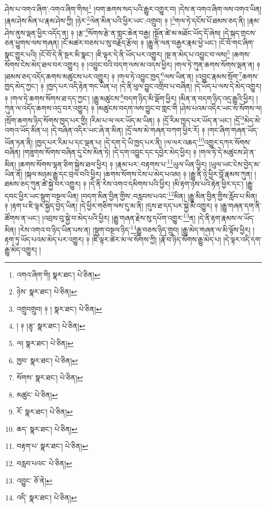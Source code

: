 ཤེས་པ་འགའ་ཞིག་:འགའ་ཞིག་གིས།\footnote{འགའ་ཞིག་གི།  སྣར་ཐང་།  པེ་ཅིན། } །བག་ཆགས་སད་པའི་རྒྱུར་འགྱུར་བ། །དེས་ན་འགའ་ཞིག་ལས་འགའ་ཡིན། །རྣམ་ཤེས་མིན་པ་རྣམ་ཤེས་ཀྱི། །ཉེར་\footnote{ཉེས་  སྣར་ཐང་།  པེ་ཅིན། }ལེན་མིན་པའི་ཕྱིར་ཡང་:འགྲུབ། ༈ །\footnote{འགྲུབགྲུབ། ༈ །  སྣར་ཐང་།  པེ་ཅིན། }གལ་ཏེ་དངོས་པོ་ཐམས་ཅད་ནི། །རྣམ་ཤེས་ནུས་ལྡན་ཕྱིར་འདོད་ན། ༈ །རྩ་\footnote{། ༈ །རྩྭ་  སྣར་ཐང་།  པེ་ཅིན། }སོགས་རྩེ་ན་གླང་ཆེན་བརྒྱ། །སྔོན་ཚེ་མ་མཐོང་ཡོད་དོ་ཞེས། །དེ་སྐད་གྲངས་ཅན་ཕྱུགས་ལས་གཞན། །ངོ་མཚར་བཅས་པ་སུ་བརྗོད་རྩོལ། ༈ །རྒྱུ་ནི་ལན་བརྒྱར་རྣམ་ཕྱེ་ཡང་། །ངོ་བོ་གང་ཞིག་སྣང་གྱུར་པའི། །ངོ་བོ་དེ་ནི་སྔར་མི་སྣང་། །ཇི་ལྟར་དེ་ནི་ཡོད་པར་འགྱུར། །སྔ་ན་མེད་པ་འབྱུང་བ་ལས།\footnote{ལ།  སྣར་ཐང་།  པེ་ཅིན། } །ཆགས་སོགས་ངེས་མེད་ཐལ་བར་འགྱུར། ༈ །འབྱུང་བའི་བདག་ལས་མ་འདས་ཕྱིར། །གལ་ཏེ་ཀུན་ཆགས་སོགས་ལྡན་ན། ༈ །ཐམས་ཅད་འདོད་ཆགས་མཚུངས་པར་འགྱུར། ༈ །གལ་ཏེ་འབྱུང་ཁྱད་\footnote{ཁྱབ་  སྣར་ཐང་།  པེ་ཅིན། }ལས་ཡིན་ན། །འབྱུང་རྣམས་སྲོག་\footnote{སོགས་  སྣར་ཐང་།  པེ་ཅིན། }ཆགས་ཁྱད་མེད་ཀྱང་། ༈ །ཁྱད་པར་འདི་རྟེན་གང་ཡིན་པ། །དེ་ནི་ཕུལ་བྱུང་འགྲིབ་པ་བཞིན། །དེ་ཡོད་པ་ལས་དེ་མེད་འགྱུར། ༈ །གལ་ཏེ་ཆགས་སོགས་ཐ་དད་ཀྱང་། །རྒྱུ་མཚུངས་\footnote{མཚུང་  པེ་ཅིན། }བདག་ཉིད་མི་ལྡོག་ཕྱིར། །མིན་ན་བདག་ཉིད་འདྲ་རྒྱུའི་ཕྱིར། །ཀུན་ལ་འདོད་ཆགས་འདྲ་བར་འགྱུར། ༈ །མཚུངས་བདག་ལས་བྱུང་བ་གླང་གི །ཤེས་པའམ་འདིར་ཡང་ས་སོགས་ལ། །སྲོག་ཆགས་ཉིད་སོགས་ཁྱད་པར་གྱི། །རིམ་པ་ལ་ལར་ཡོད་མ་ཡིན། ༈ །དྲོ་རིམ་ཁྱད་པར་ཡོད་ན་ཡང་། །དྲོ་\footnote{རོ་  སྣར་ཐང་།  པེ་ཅིན། }མེད་མེ་འགའ་ཡོད་མིན་པ། །དེ་བཞིན་འདིར་ཡང་ཞེ་ན་མིན། །དྲོ་ལས་མེ་གཞན་བཀག་ཕྱིར་རོ། ༈ །གང་ཞིག་གཞན་ཡོད་ཡོན་ཏན་ནི། །ཁྱད་པར་རིམ་པ་དང་ལྡན་པ། །དེ་དག་དེ་ཡི་ཁྱད་པར་ནི། །ལ་ལར་འཆད་\footnote{ཆད་  སྣར་ཐང་།  པེ་ཅིན། }འགྱུར་དཀར་སོགས་བཞིན། །གཟུགས་སོགས་བཞིན་དུ་ངེས་མིན་ཏེ། །དེ་དག་འབྱུང་དང་དབྱེར་མེད་ཕྱིར། ༈ །གལ་ཏེ་དེ་མཚུངས་ཤེ་ན་མིན། །ཆགས་སོགས་ལྷན་ཅིག་སྐྱེས་ཐལ་ཕྱིར། ༈ །རྣམ་པར་:བརྟགས་པ་\footnote{བརྟག་པ་  སྣར་ཐང་།  པེ་ཅིན། }ཡུལ་ཡིན་ཕྱིར། །ཡུལ་ཡང་ངེས་བྱེད་མ་ཡིན་ནོ། །སྐལ་མཉམ་རྒྱུ་དང་བྲལ་བའི་ཕྱིར། །ཆགས་སོགས་ངེས་པ་མེད་པའམ། ༈ །རྒྱུ་ནི་ཉེ་ཕྱིར་བློ་རྣམས་ཀུན། །ཐམས་ཅད་ཀུན་ཚེ་སྐྱེ་བར་འགྱུར། ༈ །དེ་ནི་རེས་འགའ་དམིགས་པའི་ཕྱིར། །མི་རྟག་ཉེས་པའི་རྟེན་ཕྱིར་དང་། །རྒྱུ་དབང་ཕྱིར་ཡང་སྡུག་བསྔལ་ཡིན། །བདག་མིན་བྱིན་གྱིས་:བརླབས་པའང་\footnote{བརླབ་པའང་  པེ་ཅིན། }མིན། །རྒྱུ་མིན་བྱིན་གྱིས་རློབ་པ་མིན། ༈ །རྟག་པ་ཇི་ལྟར་སྐྱེད་བྱེད་ཡིན། །དེ་ཕྱིར་གཅིག་ལས་དུ་མ་ནི། །དུས་ཐ་དད་པར་སྐྱེ་མི་འགྱུར། ༈ །རྒྱུ་གཞན་དག་ནི་ཚོགས་ན་ཡང་། །འབྲས་བུ་སྐྱེ་བ་མེད་པའི་ཕྱིར། །རྒྱུ་གཞན་རྗེས་སུ་དཔོག་འགྱུར་\footnote{འབྱུང་  ཅོ་ནེ། }ན། །དེ་ནི་རྟག་རྣམས་ལ་ཡོད་མིན། །རེས་འགའ་བ་ཉིད་ཡིན་པས་ན། །སྡུག་བསྔལ་ཉིད་\footnote{འདི་  སྣར་ཐང་།  པེ་ཅིན། }རྒྱུ་བཅས་ཉིད་གྲུབ། །རྒྱུ་མེད་གཞན་ལ་མི་ལྟོས་ཕྱིར། །རྟག་ཏུ་ཡོད་པའམ་མེད་པར་འགྱུར། ༈ །ཇི་ལྟར་ཚེར་མ་ལ་སོགས་ཀྱི། །རྣོ་བ་ཉིད་སོགས་རྒྱུ་མེད་པ། །དེ་ལྟར་འདི་དག་རྒྱུ་མེད་འགྱུར། །
